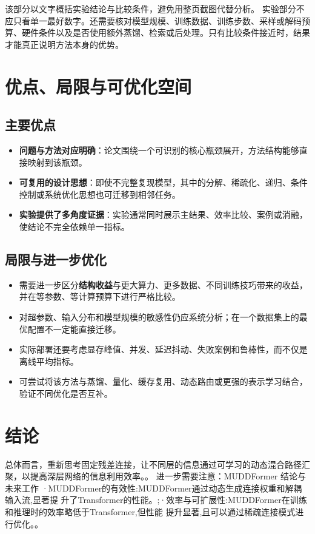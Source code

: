 \documentclass[UTF8,11pt,a4paper]{ctexart}
\newcommand{\term}[1]{\textbf{\textcolor{mainblue}{#1}}}
\begin{document}
该部分以文字概括实验结论与比较条件，避免用整页截图代替分析。
实验部分不应只看单一最好数字。还需要核对模型规模、训练数据、训练步数、采样或解码预算、硬件条件以及是否使用额外蒸馏、检索或后处理。只有比较条件接近时，结果才能真正说明方法本身的优势。

\section{优点、局限与可优化空间}
\subsection{主要优点}
\begin{itemize}
\item \term{问题与方法对应明确}：论文围绕一个可识别的核心瓶颈展开，方法结构能够直接映射到该瓶颈。
\item \term{可复用的设计思想}：即使不完整复现模型，其中的分解、稀疏化、递归、条件控制或系统优化思想也可迁移到相邻任务。
\item \term{实验提供了多角度证据}：实验通常同时展示主结果、效率比较、案例或消融，使结论不完全依赖单一指标。
\end{itemize}

\subsection{局限与进一步优化}
\begin{itemize}
\item 需要进一步区分\term{结构收益}与更大算力、更多数据、不同训练技巧带来的收益，并在等参数、等计算预算下进行严格比较。
\item 对超参数、输入分布和模型规模的敏感性仍应系统分析；在一个数据集上的最优配置不一定能直接迁移。
\item 实际部署还要考虑显存峰值、并发、延迟抖动、失败案例和鲁棒性，而不仅是离线平均指标。
\item 可尝试将该方法与蒸馏、量化、缓存复用、动态路由或更强的表示学习结合，验证不同优化是否互补。
\end{itemize}

\section{结论}
总体而言，重新思考固定残差连接，让不同层的信息通过可学习的动态混合路径汇聚，以提高深层网络的信息利用效率。。 进一步需要注意：MUDDFormer 结论与未来工作 ·MUDDFormer的有效性:MUDDFormer通过动态生成连接权重和解耦输入流,显著提 升了Transformer的性能。;·效率与可扩展性:MUDDFormer在训练和推理时的效率略低于Transformer,但性能 提升显著,且可以通过稀疏连接模式进行优化。。
\end{document}
